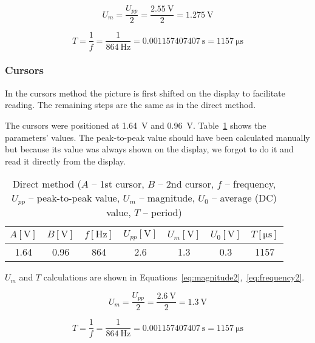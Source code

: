 \begin{equation}
	U_{m} = \frac{U_{pp}}{2} = \frac{\SI{2.55}{\volt}}{2} = \SI{1.275}{\volt}
	\label{eq:magnitude}
\end{equation}

\begin{equation}
	T = \frac{1}{f} = \frac{1}{\SI{864}{\hertz}} = \SI{0.001157407407}{\second} = \SI{1157}{\micro\second}
	\label{eq:frequency}
\end{equation}

\subsubsection*{Cursors}

In the cursors method the picture is first shifted on the display to facilitate reading. The remaining steps are the same as in the direct method.

The cursors were positioned at \SI{1.64}{\volt} and \SI{0.96}{\volt}. Table~\ref{tab:cursors-method} shows the parameters' values. The peak-to-peak value should have been calculated manually but because its value was always shown on the display, we forgot to do it and read it directly from the display.

\begin{table}[H]
	\centering
	\begin{tabular}{c|c|c|c|c|c|c}
		$A [\unit\volt]$ & $B [\unit\volt]$ & $f [\unit{\hertz}]$ & $U_{pp} [\unit{\volt}]$ & $U_{m} [\unit{\volt}]$ & $U_{0} [\unit{\volt}]$ & $T [\unit{\micro\second}]$\\
		\hline
		1.64 & 0.96 & 864 & 2.6 & 1.3 & 0.3 & 1157
	\end{tabular}
	\caption{Direct method ($A$ -- 1st cursor, $B$ -- 2nd cursor, $f$ -- frequency, $U_{pp}$ -- peak-to-peak value, $U_{m}$ -- magnitude, $U_{0}$ -- average (DC) value, $T$ -- period)}
	\label{tab:cursors-method}
\end{table}

$U_{m}$ and $T$ calculations are shown in Equations~\ref{eq:magnitude2},~\ref{eq:frequency2}.

\begin{equation}
	U_{m} = \frac{U_{pp}}{2} = \frac{\SI{2.6}{\volt}}{2} = \SI{1.3}{\volt}
	\label{eq:magnitude2}
\end{equation}

\begin{equation}
	T = \frac{1}{f} = \frac{1}{\SI{864}{\hertz}} = \SI{0.001157407407}{\second} = \SI{1157}{\micro\second}
	\label{eq:frequency2}
\end{equation}


